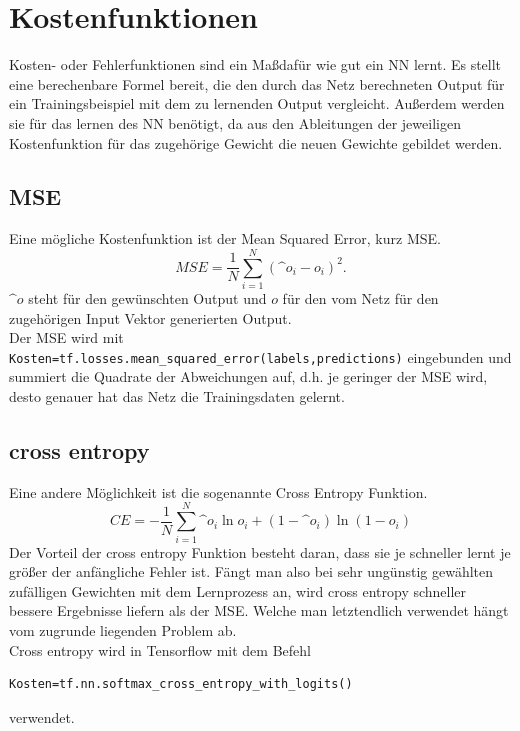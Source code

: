\section{Kostenfunktionen}
Kosten- oder Fehlerfunktionen sind ein Ma\ss dafür wie gut ein \gls{NN} lernt. Es stellt eine berechenbare Formel bereit, die den durch das Netz berechneten Output für ein Trainingsbeispiel mit dem zu lernenden Output vergleicht. Au\ss erdem werden sie für das lernen des \gls{NN} benötigt, da aus den Ableitungen der jeweiligen Kostenfunktion für das zugehörige Gewicht die neuen Gewichte gebildet werden.\cite{Goodfellow}
\subsection{MSE}
Eine m\"ogliche Kostenfunktion ist der Mean Squared Error, kurz MSE.
\begin{equation}
MSE=\frac{1}{N}\sum_{i=1}^{N} (\^{o}_i-o_i)^2.
\end{equation}\cite{Rojas1996}
$\^{o}$ steht für den gewünschten Output und $o$ f\"ur den vom Netz für den zugehörigen Input Vektor generierten Output.\\
Der MSE wird mit  \lstinline$Kosten=tf.losses.mean_squared_error(labels,predictions)$\cite{cookbook} eingebunden und summiert die Quadrate der Abweichungen auf, d.h. je geringer der MSE wird, desto genauer hat das Netz die Trainingsdaten gelernt.
\subsection{cross entropy}
Eine andere Möglichkeit ist die sogenannte Cross Entropy Funktion.\cite{Nielsen}
\begin{equation}
CE= - \frac{1}{N} \sum_{i=1}^{N}\^{o}_i \ln o_i + (1- \^{o}_i) \ln (1-o_i)
\end{equation}
Der Vorteil der cross entropy Funktion besteht daran, dass sie je schneller lernt je grö\ss er der anfängliche Fehler ist. Fängt man also bei sehr ungünstig gewählten zufälligen Gewichten mit dem Lernprozess an, wird cross entropy schneller bessere Ergebnisse liefern als der MSE.\cite{Nielsen} Welche man letztendlich verwendet hängt vom zugrunde liegenden Problem ab.\\
Cross entropy wird in Tensorflow mit dem Befehl 
\begin{lstlisting}
Kosten=tf.nn.softmax_cross_entropy_with_logits()
\end{lstlisting}verwendet.\cite{cookbook}
